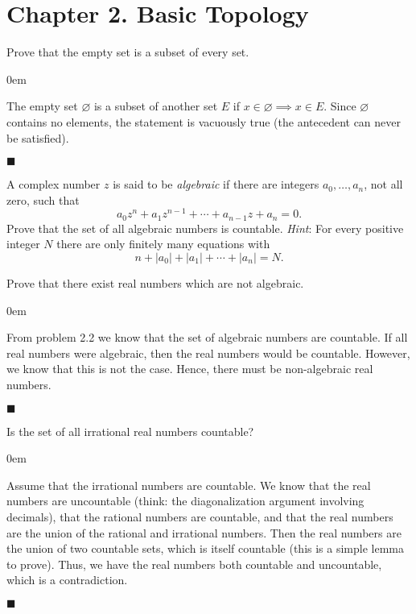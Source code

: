 \documentclass[12pt]{article}
\renewcommand{\qed}{\hfill$\blacksquare$}
\renewenvironment{proof}{\begin{addmargin}[1em]{0em}\begin{newproof}}{\end{newproof}\end{addmargin}\qed}
\newenvironment{problem}[2][Exercise]{\begin{trivlist}
\item[\hskip \labelsep {\bfseries #1}\hskip \labelsep {\bfseries #2.}]}{\end{trivlist}}
\begin{document}
\newpage
\section*{Chapter 2. Basic Topology}

\begin{problem}{2.1}
Prove that the empty set is a subset of every set.
\end{problem}
\begin{proof}
The empty set $\varnothing$ is a subset of another set $E$ if $x \in \varnothing\implies x \in E$. Since $\varnothing$ contains no elements, the statement is vacuously true (the antecedent can never be satisfied).
\end{proof}



\begin{problem}{2.2}
A complex number $z$ is said to be \textit{algebraic} if there are integers $a_0,\ldots,a_n$, not all zero, such that $$ a_0 z^n + a_1 z^{n-1} + \cdots + a_{n-1} z + a_n = 0.$$ Prove that the set of all algebraic numbers is countable. \textit{Hint}: For every positive integer $N$ there are only finitely many equations with $$ n + \left|a_0\right| + \left|a_1\right| + \cdots + \left|a_n\right| = N.$$
\end{problem}



\begin{problem}{2.3}
Prove that there exist real numbers which are not algebraic.
\end{problem}
\begin{proof}
From problem 2.2 we know that the set of algebraic numbers are countable. If all real numbers were algebraic, then the real numbers would be countable. However, we know that this is not the case. Hence, there must be non-algebraic real numbers.
\end{proof}










\begin{problem}{2.4}
Is the set of all irrational real numbers countable?
\end{problem}
\begin{proof}
Assume that the irrational numbers are countable. We know that the real numbers are uncountable (think: the diagonalization argument involving decimals), that the rational numbers are countable, and that the real numbers are the union of the rational and irrational numbers. Then the real numbers are the union of two countable sets, which is itself countable (this is a simple lemma to prove). Thus, we have the real numbers both countable and uncountable, which is a contradiction.
\end{proof}
\end{document}
